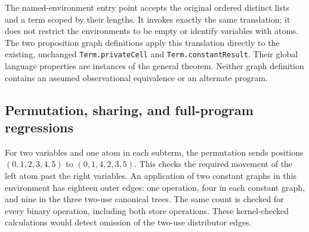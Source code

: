 



The named-environment entry point accepts the original ordered distinct
lists and a term scoped by their lengths. It invokes exactly the same
translation; it does not restrict the environments to be empty or identify
variables with atoms. The two proposition graph definitions apply this
translation directly to the existing, unchanged \texttt{Term.privateCell}
and \texttt{Term.constantResult}. Their global language properties are
instances of the general theorem. Neither graph definition contains an
assumed observational equivalence or an alternate program.






\subsection{Permutation, sharing, and full-program regressions}

For two variables and one atom in each subterm, the permutation sends
positions $(0,1,2,3,4,5)$ to $(0,1,4,2,3,5)$. This checks the required
movement of the left atom past the right variables. An application of two
constant graphs in this environment has eighteen outer edges: one operation,
four in each constant graph, and nine in the three two-use canonical trees.
The same count is checked for every binary operation, including both store
operations. These kernel-checked calculations would detect omission of the
two-use distributor edges.



